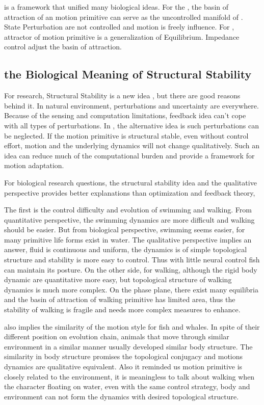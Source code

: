 \moit is a framework that unified many biological ideas.
For the  \umh,  the basin of attraction of an motion primitive can serve as the uncontrolled manifold of \umh.
State Perturbation are not controlled and motion is freely influence.
For \eph, attractor of motion primitive is a generalization of Equilibrium.
Impedance control adjust the basin of attraction.





\subsection{the Biological Meaning of Structural Stability}
For \cms research, Structural Stability is a new idea , but there are good reasons behind it. 
In natural environment, perturbations and uncertainty are everywhere. 
Because of the sensing and computation limitations,  feedback idea  can't cope with all types of perturbations.
In \moit, the alternative idea is such perturbations can be neglected.
If the motion primitive is structural stable, even without control effort, motion and the underlying dynamics will not change qualitatively.
Such an idea can reduce much of the computational burden and provide a framework for motion adaptation.


For biological research questions, the structural stability idea and the qualitative perspective provides better explanations than optimization and feedback theory,

The first is the control difficulty and  evolution of swimming and walking.
From quantitative perspective, the swimming dynamics are more difficult and walking should be easier.
But from  biological perspective, swimming seems easier, for many primitive life forms exist in water.
The qualitative perspective implies an answer, fluid is continuous and uniform, the dynamics is of simple topological structure and stability is more easy to control.
Thus with little neural control fish can maintain its posture. 
On the other side, for walking, although the rigid body dynamic are quantitative more easy, but topological structure of walking dynamics is much more complex. 
On the phase plane, there exist many equilibria and the basin of attraction of walking primitive has limited area,
thus the  stability of walking is fragile and needs more complex measures to enhance.

\moit also implies the similarity of the motion style for fish and whales.
In spite of their different position on evolution chain, animals that move through similar environment in a similar manner usually developed similar body structure.
The similarity in body structure promises the topological conjugacy and motions dynamics are qualitative equivalent.
Also it reminded us motion primitive is closely related to the environment, it is meaningless to talk about walking when the character floating on water, even with the same control strategy, body and environment can not form the dynamics with desired topological structure.



